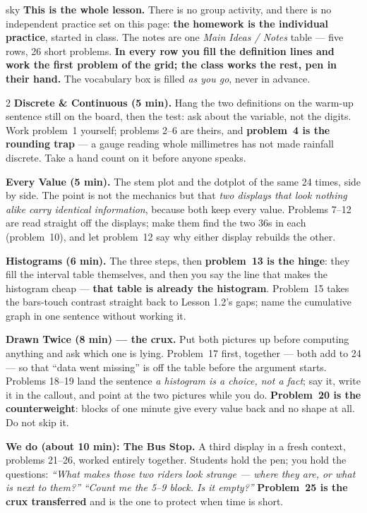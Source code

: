 \documentclass[10pt]{article}
\begin{document}
\boxguard
\begin{skillbox}{sky}
\textbf{This is the whole lesson.} There is no group activity, and there is no independent
practice set on this page: \textbf{the homework is the individual practice}, started in class.
The notes are one \emph{Main Ideas / Notes} table --- five rows, 26 short problems. \textbf{In
every row you fill the definition lines and work the first problem of the grid; the class works
the rest, pen in their hand.} The vocabulary box is filled \emph{as you go}, never in advance.
\begin{multicols}{2}
\textbf{Discrete \& Continuous (5 min).} Hang the two definitions on the warm-up sentence still
on the board, then the test: ask about the variable, not the digits. Work problem~1 yourself;
problems 2--6 are theirs, and \textbf{problem~4 is the rounding trap} --- a gauge reading whole
millimetres has not made rainfall discrete. Take a hand count on it before anyone speaks.

\textbf{Every Value (5 min).} The stem plot and the dotplot of the same 24 times, side by side.
The point is not the mechanics but that \emph{two displays that look nothing alike carry
identical information}, because both keep every value. Problems 7--12 are read straight off the
displays; make them find the two 36s in each (problem~10), and let problem~12 say why either
display rebuilds the other.

\textbf{Histograms (6 min).} The three steps, then \textbf{problem~13 is the hinge}: they fill
the interval table themselves, and then you say the line that makes the histogram cheap ---
\textbf{that table is already the histogram}. Problem~15 takes the bars-touch contrast straight
back to Lesson 1.2's gaps; name the cumulative graph in one sentence without working it.

\textbf{Drawn Twice (8 min) --- the crux.} Put both pictures up before computing anything and
ask which one is lying. Problem~17 first, together --- both add to 24 --- so that ``data went
missing'' is off the table before the argument starts. Problems 18--19 land the sentence
\emph{a histogram is a choice, not a fact}; say it, write it in the callout, and point at the
two pictures while you do. \textbf{Problem~20 is the counterweight}: blocks of one minute give
every value back and no shape at all. Do not skip it.

\columnbreak
\textbf{We do (about 10 min): The Bus Stop.} A third display in a fresh context, problems
21--26, worked entirely together. Students hold the pen; you hold the questions: \emph{``What
makes those two riders look strange --- where they are, or what is next to them?''} \quad
\emph{``Count me the 5--9 block. Is it empty?''} \textbf{Problem~25 is the crux transferred}
and is the one to protect when time is short.


\end{multicols}
\end{skillbox}
\end{document}
